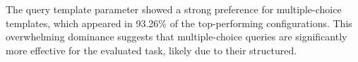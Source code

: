 
The query template parameter showed a strong preference for multiple-choice templates, which appeared in 93.26\% of the top-performing configurations. 
This overwhelming dominance suggests that multiple-choice queries are significantly more effective for the evaluated task, likely due to their structured.

